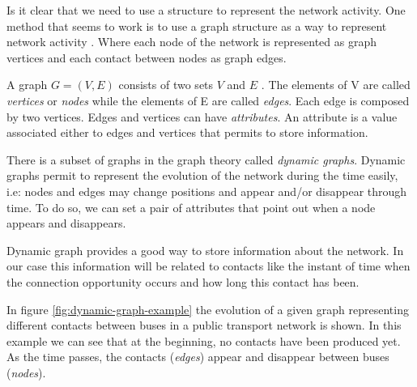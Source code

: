 
Is it clear that we need to use a structure to represent the network activity. One method that seems to work is to use a graph structure as a way to represent network activity . Where each node of the network is represented as graph vertices and each contact between nodes as graph edges. 

A graph $G = (V, E)$ consists of two sets $V$ and $E$ \cite{gross2013handbook}. The elements of V are called \textit{vertices} or \textit{nodes} while the elements of E are called \textit{edges}. Each edge is composed by two vertices. Edges and vertices can have \textit{attributes}. An attribute is a value associated either to edges and vertices that permits to store information.

There is a subset of graphs in the graph theory called \textit{dynamic graphs}. Dynamic graphs permit to represent the evolution of the network during the time easily, i.e: nodes and edges may change positions and appear and/or disappear through time. To do so, we can set a pair of attributes that point out when a node appears and disappears.

Dynamic graph provides a good way to store information about the network. In our case this information will be related to contacts like the instant of time when the connection opportunity occurs and how long this contact has been.

In figure \ref{fig:dynamic-graph-example} the evolution of a given graph representing different contacts between buses in a public transport network is shown. In this example we can see that at the beginning, no contacts have been produced yet. As the time passes, the contacts (\textit{edges}) appear and disappear between buses (\textit{nodes}). 

